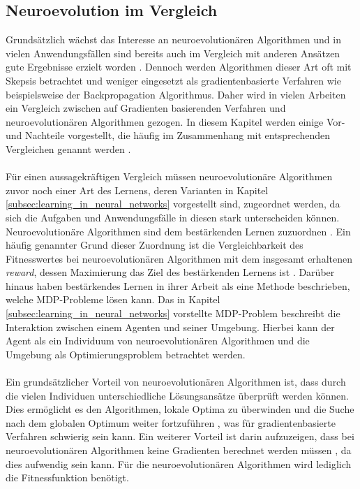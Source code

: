 \subsection{Neuroevolution im Vergleich}
\label{subsec:comparision_neuroevoltion}
Grundsätzlich wächst das Interesse an neuroevolutionären Algorithmen und in vielen Anwendungsfällen sind bereits auch im Vergleich mit anderen Ansätzen gute Ergebnisse erzielt worden \cite{meisner2009neurostrategies}. Dennoch werden Algorithmen dieser Art oft mit Skepsis betrachtet und weniger eingesetzt als gradientenbasierte Verfahren wie beispielsweise der Backpropagation Algorithmus. Daher wird in vielen Arbeiten ein Vergleich zwischen auf Gradienten basierenden Verfahren und neuroevolutionären Algorithmen gezogen. In diesem Kapitel werden einige Vor- und Nachteile vorgestellt, die häufig im Zusammenhang mit entsprechenden Vergleichen genannt werden \cite{whitley1993genetic, such2017deep, rojas1996neural, meisner2009neurostrategies}.
\\\\
Für einen aussagekräftigen Vergleich müssen neuroevolutionäre Algorithmen zuvor noch einer Art des Lernens, deren Varianten in Kapitel \ref{subsec:learning_in_neural_networks} vorgestellt sind, zugeordnet werden, da sich die Aufgaben und Anwendungsfälle in diesen stark unterscheiden können. Neuroevolutionäre Algorithmen sind dem bestärkenden Lernen zuzuordnen \cite{whitley1993genetic}. Ein häufig genannter Grund dieser Zuordnung ist die Vergleichbarkeit des Fitnesswertes bei neuroevolutionären Algorithmen mit dem insgesamt erhaltenen \emph{reward}, dessen Maximierung das Ziel des bestärkenden Lernens ist \cite{such2017deep}. Darüber hinaus haben \citeauthor{sutton2018reinforcement} bestärkendes Lernen in ihrer Arbeit als eine Methode beschrieben, welche \ac{MDP}-Probleme lösen kann. Das in Kapitel \ref{subsec:learning_in_neural_networks} vorstellte \ac{MDP}-Problem beschreibt die Interaktion zwischen einem Agenten und seiner Umgebung. Hierbei kann der Agent als ein Individuum von neuroevolutionären Algorithmen und die Umgebung als Optimierungsproblem betrachtet werden. 
\\\\
Ein grundsätzlicher Vorteil von neuroevolutionären Algorithmen ist, dass durch die vielen Individuen unterschiedliche Lösungsansätze überprüft werden können. Dies ermöglicht es den Algorithmen, lokale Optima zu überwinden und die Suche nach dem globalen Optimum weiter fortzuführen \cite{rojas1996neural}, was für gradientenbasierte Verfahren schwierig sein kann. Ein weiterer Vorteil ist darin aufzuzeigen, dass bei neuroevolutionären Algorithmen keine Gradienten berechnet werden müssen \cite{rojas1996neural}, da dies aufwendig sein kann. Für die neuroevolutionären Algorithmen wird lediglich die Fitnessfunktion benötigt. 
